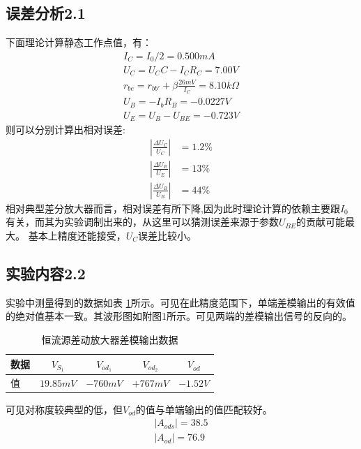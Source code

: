 \documentclass[a4paper,11pt,UTF8]{ctexart}
\begin{document}
\subsection{误差分析2.1}
下面理论计算静态工作点值，有：
\begin{equation}
  \begin{aligned}
    I_C=I_0/2=0.500 mA\\
    U_C=U_CC-I_CR_C=7.00V\\
    r_{be}=r_{bb'}+\beta\frac{26mV}{I_C}=8.10k\Omega\\
    U_{B}=-I_bR_B=-0.0227V\\
    U_{E}=U_{B}-U_{BE}=-0.723V
  \end{aligned}
\end{equation}
则可以分别计算出相对误差:
\begin{equation}
  \begin{aligned}
    \left |\frac{\Delta U_C}{U_C}\right |&=1.2\%\\
    \left |\frac{\Delta U_E}{U_E}\right |&=13\%\\
    \left |\frac{\Delta U_B}{U_B}\right |&=44\%
  \end{aligned}
\end{equation}
相对典型差分放大器而言，相对误差有所下降,因为此时理论计算的依赖主要跟$I_0$有关，而其为实验调制出来的，从这里可以猜测误差来源于参数$U_{BE}$的贡献可能最大。
基本上精度还能接受，$U_C$误差比较小。
\subsection{实验内容2.2}
实验中测量得到的数据如表 \ref{tab:sdTab}所示。可见在此精度范围下，单端差模输出的有效值的绝对值基本一致。其波形图如附图1所示。可见两端的差模输出信号的反向的。
\begin{table}[!h!tbp]
  \caption{恒流源差动放大器差模输出数据}\label{tab:sdTab}
    \centering
    \begin{tabular}{|l|c|c|c|c|}
    \hline
    数据 &$V_{S_1}$&$V_{od_1}$&$V_{od_2}$&$V_{od}$         \\ \hline
    值   &$19.85mV$&$-760mV$&$+767mV$&$-1.52V$     \\ \hline
  \end{tabular}
  \end{table}
  可见对称度较典型的低，但$V_{od}$的值与单端输出的值匹配较好。
  \begin{equation}
    \begin{aligned}
      \left |A_{ods}\right |=38.5\\
      \left |A_{od}\right |=76.9
    \end{aligned}
  \end{equation}
\end{document}
